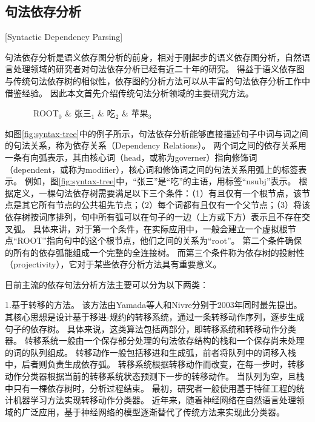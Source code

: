 \subsection{句法依存分析}[Syntactic Dependency Parsing]

句法依存分析是语义依存图分析的前身，相对于刚起步的语义依存图分析，自然语言处理领域的研究者对句法依存分析已经有近二十年的研究。
得益于语义依存图与传统句法依存树的相似性，依存图的分析方法可以从丰富的句法依存分析工作中借鉴经验。
因此本文首先介绍传统句法分析领域的主要研究方法。

\begin{figure}[htb]
	\begin{center}
			\begin{dependency}[arc edge, arc angle=80, text only label, label style={above}]
				\begin{deptext} [row sep=0.4cm, column sep=.1cm]
					\ ROOT$_0$ \& 张三$_1$ \& 吃$_2$ \& 苹果$_3$ \\
				\end{deptext}
			\end{dependency}
	\end{center}
\end{figure}

如图\ref{fig:syntax-tree}中的例子所示，句法依存分析能够直接描述句子中词与词之间的句法关系，称为依存关系（Dependency Relations）。
两个词之间的依存关系用一条有向弧表示，其由核心词（head，或称为governer）指向修饰词（dependent，或称为modifier），核心词和修饰词之间的句法关系用弧上的标签表示。
例如，图\ref{fig:syntax-tree}中，“张三”是“吃”的主语，用标签“nsubj”表示。
根据定义，一棵句法依存树需要满足以下三个条件：（1）有且仅有一个根节点，该节点是其它所有节点的公共祖先节点；（2）每个词都有且仅有一个父节点；（3）将该依存树按词序排列，句中所有弧可以在句子的一边（上方或下方）表示且不存在交叉弧。
具体来讲，对于第一个条件，在实际应用中，一般会建立一个虚拟根节点“ROOT”指向句中的这个根节点，他们之间的关系为“root”。
第二个条件确保的所有的依存弧能组成一个完整的全连接树。
而第三个条件称为依存树的投射性（projectivity），它对于某些依存分析方法具有重要意义。

目前主流的依存句法分析方法主要可以分为以下两类：

1.基于转移的方法。
该方法由Yamada等人\cite{yamada-etal-2003-statistical}和Nivre\cite{nivre-2003-efficient}分别于2003年同时最先提出。
其核心思想是设计基于移进-规约的转移系统，通过一条转移动作序列，逐步生成句子的依存树。
具体来说，这类算法包括两部分，即转移系统和转移动作分类器。
转移系统一般由一个保存部分处理的句法依存结构的栈和一个保存尚未处理的词的队列组成。
转移动作一般包括移进和生成弧，前者将队列中的词移入栈中，后者则负责生成依存弧。
转移系统根据转移动作而改变，在每一步时，转移动作分类器根据当前的转移系统状态预测下一步的转移动作。
当队列为空，且栈中只有一棵依存树时，分析过程结束。
最初，研究者一般使用基于特征工程的统计机器学习方法实现转移动作分类器。
近年来，随着神经网络在自然语言处理领域的广泛应用，基于神经网络的模型逐渐替代了传统方法来实现此分类器。

